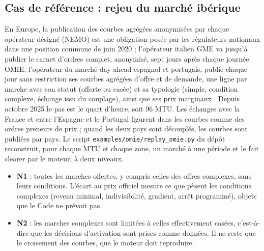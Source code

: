 \documentclass[a4paper,12pt]{article}
\theoremstyle{definition}
\begin{document}
\subsection{Cas de référence : rejeu du marché ibérique}\label{sec:omie}

En Europe, la publication des courbes agrégées anonymisées par chaque opérateur désigné (NEMO) est une obligation posée par les régulateurs nationaux dans une position commune de juin 2020 \citep{nemo2026curves} ; l'opérateur italien GME va jusqu'à publier le carnet d'ordres complet, anonymisé, sept jours après chaque journée. OMIE, l'opérateur du marché day-ahead espagnol et portugais, publie chaque jour sans restriction ses courbes agrégées d'offre et de demande, une ligne par marche avec son statut (offerte ou casée) et sa typologie (simple, condition complexe, échange issu du couplage), ainsi que ses prix marginaux \citep{omie2026}. Depuis octobre 2025 le pas est le quart d'heure, soit 96 MTU. Les échanges avec la France et entre l'Espagne et le Portugal figurent dans les courbes comme des ordres preneurs de prix ; quand les deux pays sont découplés, les courbes sont publiées par pays. Le script \texttt{examples/omie/replay\_omie.py} du dépôt reconstruit, pour chaque MTU et chaque zone, un marché à une période et le fait clearer par le moteur, à deux niveaux.

\begin{itemize}
\item \textbf{N1} : toutes les marches offertes, y compris celles des offres complexes, sans leurs conditions. L'écart au prix officiel mesure ce que pèsent les conditions complexes (revenu minimal, indivisibilité, gradient, arrêt programmé), objets que le Code ne prévoit pas.
\item \textbf{N2} : les marches complexes sont limitées à celles effectivement casées, c'est-à-dire que les décisions d'activation sont prises comme données. Il ne reste que le croisement des courbes, que le moteur doit reproduire.
\end{itemize}
\end{document}
